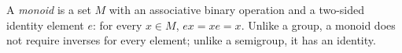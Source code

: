 
A \emph{monoid} is a set $M$ with an associative binary operation and a two-sided identity element $e$: for every $x\in M$, $ex=xe=x$. Unlike a group, a monoid does not require inverses for every element; unlike a semigroup, it has an identity.
